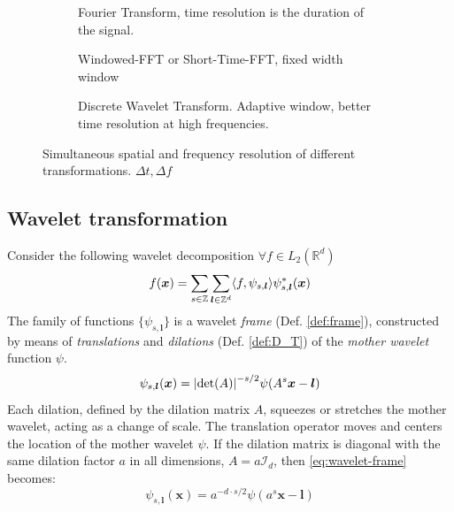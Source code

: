 \begin{figure}[H]
  \begin{subfigure}[t]{.33\textwidth}
    \centering
    
    \captionsetup{width=0.8\textwidth}
    \caption{Fourier Transform, time resolution is the duration of the signal.}
    \label{fig:grid_a_fft}
  \end{subfigure}%
  \begin{subfigure}[t]{.33\textwidth}
    \centering
    
    \captionsetup{width=0.8\textwidth}
    \caption{Windowed-FFT or Short-Time-FFT, fixed width window}
    \label{fig:grid_b_windowed}
  \end{subfigure}%
  \begin{subfigure}[t]{.33\textwidth}
    \centering
    
    \captionsetup{width=0.8\textwidth}
    \caption{Discrete Wavelet Transform. Adaptive window, better time resolution at high frequencies.}
    \label{fig:grid_c_wavelet}
  \end{subfigure}
  \caption{Simultaneous spatial and frequency resolution of different transformations. $\Delta t, \Delta f$}
  \label{fig:grids}
\end{figure}

\subsection{Wavelet transformation}
\label{sub:transform}

Consider the following wavelet decomposition $\forall f \in L_2(\mathbb{R}^d)$
\begin{equation}
    f(\bm{x}) = \sum_{s \in \mathbb{Z}} \sum_{\bm{l} \in \mathbb{Z}^d} \langle f,\psi_{s,\bm{l}} \rangle \psi^{\ast}_{s,\bm{l}}(\bm{x})
\end{equation}
The family of functions $\{\psi_{s,\bm{l}}\}$ is a wavelet \textit{frame} (Def. \ref{def:frame}), constructed by means of \textit{translations} and \textit{dilations} (Def. \ref{def:D_T}) of the \textit{mother wavelet} function $\psi$.
\begin{equation}
    \psi_{s,\bm{l}}(\bm{x}) = \abs{\det(A)}^{-s/2}\psi(A^s\bm{x} - \bm{l})
\label{eq:wavelet-frame}
\end{equation}
Each dilation, defined by the dilation matrix $A$, squeezes or stretches the mother wavelet, acting as a change of scale. The translation operator moves and centers the location of the mother wavelet $\psi$. If the dilation matrix is diagonal with the same dilation factor $a$ in all dimensions, $A = a \mathcal{I}_d$, then \autoref{eq:wavelet-frame} becomes:
\begin{equation}
    \psi_{s,\bm{l}}(\bm{x}) = a^{-d\cdot s/2}\psi(a^s\bm{x} - \bm{l})
\end{equation}


